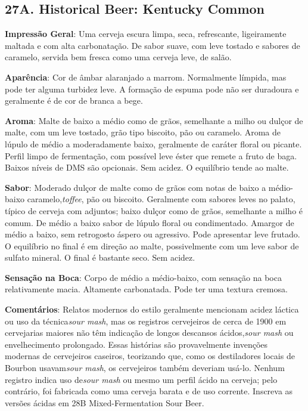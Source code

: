 \subsection*{27A. Historical Beer: Kentucky Common}
\textbf{Impressão Geral}: Uma cerveja escura limpa, seca, refrescante, ligeiramente maltada e com alta carbonatação. De sabor suave, com leve tostado e sabores de caramelo, servida bem fresca como uma cerveja leve, de salão.

\textbf{Aparência}: Cor de âmbar alaranjado a marrom. Normalmente límpida, mas pode ter alguma turbidez leve. A formação de espuma pode não ser duradoura e geralmente é de cor de branca a bege.

\textbf{Aroma}: Malte de baixo a médio como de grãos, semelhante a milho ou dulçor de malte, com um leve tostado, grão tipo biscoito, pão ou caramelo. Aroma de lúpulo de médio a moderadamente baixo, geralmente de caráter floral ou picante. Perfil limpo de fermentação, com possível leve éster que remete a fruto de baga. Baixos níveis de DMS são opcionais. Sem acidez. O equilíbrio tende ao malte.

\textbf{Sabor}: Moderado dulçor de malte como de grãos com notas de baixo a médio-baixo caramelo,\textit{toffee}, pão ou biscoito. Geralmente com sabores leves no palato, típico de cerveja com adjuntos; baixo dulçor como de grãos, semelhante a milho é comum. De médio a baixo sabor de lúpulo floral ou condimentado. Amargor de médio a baixo, sem retrogosto áspero ou agressivo. Pode apresentar leve frutado. O equilíbrio no final é em direção ao malte, possivelmente com um leve sabor de sulfato mineral. O final é bastante seco. Sem acidez.

\textbf{Sensação na Boca}: Corpo de médio a médio-baixo, com sensação na boca relativamente macia. Altamente carbonatada. Pode ter uma textura cremosa.

\textbf{Comentários}: Relatos modernos do estilo geralmente mencionam acidez láctica ou uso da técnica\textit{sour mash}, mas os registros cervejeiros de cerca de 1900 em cervejarias maiores não têm indicação de longos descansos ácidos,\textit{sour mash} ou envelhecimento prolongado. Essas histórias são provavelmente invenções modernas de cervejeiros caseiros, teorizando que, como os destiladores locais de Bourbon usavam\textit{sour mash}, os cervejeiros também deveriam usá-lo. Nenhum registro indica uso de\textit{sour mash} ou mesmo um perfil ácido na cerveja; pelo contrário, foi fabricada como uma cerveja barata e de uso corrente. Inscreva as versões ácidas em 28B Mixed-Fermentation Sour Beer.

